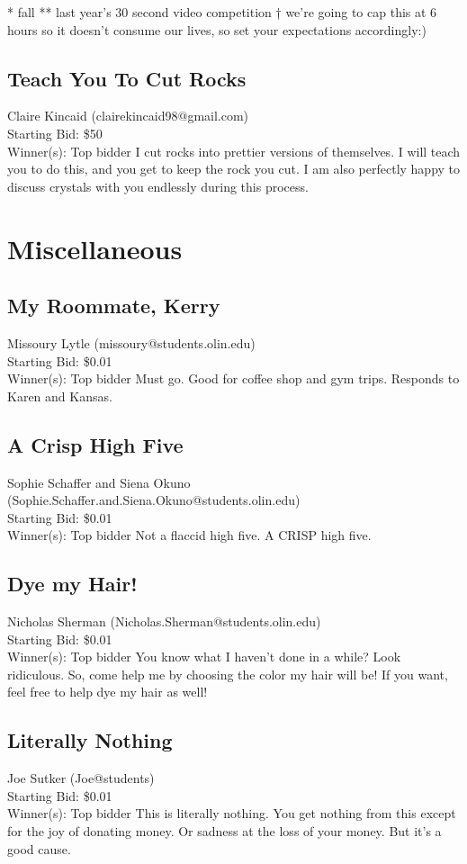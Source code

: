 \documentclass[11pt]{article}
\begin{document}
* fall
** last year's 30 second video competition
† we're going to cap this at 6 hours so it doesn't consume our lives, so set your expectations accordingly:)
\subsection{Teach You To Cut Rocks}
Claire Kincaid (clairekincaid98@gmail.com) \\
Starting Bid: \$50 \\
Winner(s): 
Top bidder\newline
I cut rocks into prettier versions of themselves.  I will teach you to do this, and you get to keep the rock you cut.  I am also perfectly happy to discuss crystals with you endlessly during this process.
\section{Miscellaneous}
\subsection{My Roommate, Kerry}
Missoury Lytle (missoury@students.olin.edu) \\
Starting Bid: \$0.01 \\
Winner(s): 
Top bidder\newline
Must go. Good for coffee shop and gym trips. Responds to Karen and Kansas.
\subsection{A Crisp High Five}
Sophie Schaffer and Siena Okuno (Sophie.Schaffer.and.Siena.Okuno@students.olin.edu) \\
Starting Bid: \$0.01 \\
Winner(s): 
Top bidder\newline
Not a flaccid high five. A CRISP high five.
\subsection{Dye my Hair!}
Nicholas Sherman (Nicholas.Sherman@students.olin.edu) \\
Starting Bid: \$0.01 \\
Winner(s): 
Top bidder\newline
You know what I haven't done in a while? Look ridiculous. So, come help me by choosing the color my hair will be! If you want, feel free to help dye my hair as well!
\subsection{Literally Nothing}
Joe Sutker (Joe@students) \\
Starting Bid: \$0.01 \\
Winner(s): 
Top bidder\newline
This is literally nothing. You get nothing from this except for the joy of donating money. Or sadness at the loss of your money. But it's a good cause.
\end{document}
